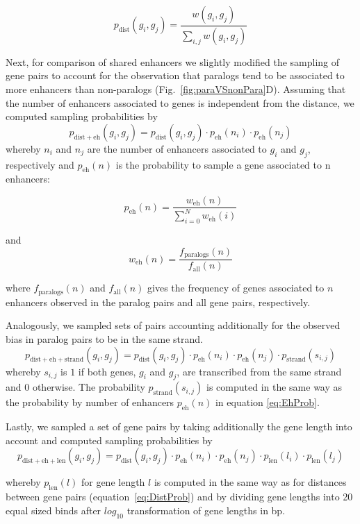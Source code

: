 \documentclass[a4paper,twoside=true,openright,parskip=full,chapterprefix=true,11pt,headings=normal,bibliography=totoc,listof=totoc,titlepage=on,captions=tableabove,draft=false]{scrreprt}
\theoremstyle{definition}
\theoremstyle{definition}
\theoremstyle{definition}
\theoremstyle{remark}
\begin{document}
\[
p_{\mathrm{dist}}(g_{i}, g_{j}) = \frac{ w(g_{i}, g_{j}) }{ \sum_{i,j} w(g_{i}, g_{j}) }
\label{eq:DistProb}
\]

Next, for comparison of shared enhancers we slightly modified the
sampling of gene pairs to account for the observation that paralogs tend
to be associated to more enhancers than non-paralogs
(Fig.~\ref{fig:paraVSnonPara}D). Assuming that the number of enhancers
associated to genes is independent from the distance, we computed
sampling probabilities by \[
p_{\mathrm{dist+eh}}(g_{i}, g_{j}) = p_{\mathrm{dist}}(g_{i}, g_{j}) \cdot p_{\mathrm{eh}}(n_{i}) \cdot p_{\mathrm{eh}}(n_{j})
\] whereby \(n_{i}\) and \(n_{j}\) are the number of enhancers
associated to \(g_{i}\) and \(g_{j}\), respectively and
\(p_{\mathrm{eh}}(n)\) is the probability to sample a gene associated to
n enhancers:

\[
p_{\mathrm{eh}}(n) = \frac{ w_{\mathrm{eh}}(n) }{ \sum_{i=0}^{N} w_{\mathrm{eh}}(i) }
\label{eq:EhProb}
\]

and \[
w_{\mathrm{eh}}(n) = \frac{ f_{\mathrm{paralogs}}(n) }{f_{\mathrm{all}}(n)}
\]

where \(f_{\mathrm{paralogs}}(n)\) and \(f_{\mathrm{all}}(n)\) gives the
frequency of genes associated to \(n\) enhancers observed in the paralog
pairs and all gene pairs, respectively.

Analogously, we sampled sets of pairs accounting additionally for the
observed bias in paralog pairs to be in the same strand. \[
p_{\mathrm{dist+eh+strand}}(g_{i}, g_{j}) = p_{\mathrm{dist}}(g_{i}, g_{j}) \cdot p_{\mathrm{eh}}(n_{i}) \cdot p_{\mathrm{eh}}(n_{j}) \cdot p_{\mathrm{strand}}(s_{i,j})
\] whereby \(s_{i,j}\) is \(1\) if both genes, \(g_{i}\) and \(g_{j}\),
are transcribed from the same strand and \(0\) otherwise. The
probability \(p_{\mathrm{strand}}(s_{i,j})\) is computed in the same way
as the probability by number of enhancers \(p_{\mathrm{eh}}(n)\) in
equation \eqref{eq:EhProb}.

Lastly, we sampled a set of gene pairs by taking additionally the gene
length into account and computed sampling probabilities by \[
p_{\mathrm{dist+eh+len}}(g_{i}, g_{j}) = p_{\mathrm{dist}}(g_{i}, g_{j}) \cdot p_{\mathrm{eh}}(n_{i}) \cdot p_{\mathrm{eh}}(n_{j}) \cdot p_{\mathrm{len}}(l_{i}) \cdot p_{\mathrm{len}}(l_{j})
\]

whereby \(p_{\mathrm{len}}(l)\) for gene length \(l\) is computed in the
same way as for distances between gene pairs
(equation~\eqref{eq:DistProb}) and by dividing gene lengths into 20 equal
sized binds after \(log_{10}\) transformation of gene lengths in bp.
\end{document}
